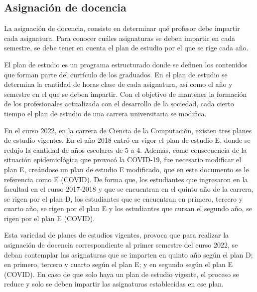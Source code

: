 





\subsection{Asignación de docencia}
La asignación de docencia, consiste en determinar qué profesor debe 
impartir cada asignatura. Para conocer cuáles asignaturas se deben impartir en 
cada semestre, se debe tener en cuenta el plan de estudio por el que se rige cada año.

El plan de estudio es un programa estructurado donde se definen los contenidos que forman parte del currículo de los 
graduados. En el plan de estudio se determina la cantidad de horas clase de cada asignatura, 
así como el año y semestre en el que se deben impartir.
Con el objetivo de mantener la formación de los profesionales actualizada con el desarrollo de la 
sociedad, cada cierto tiempo el plan de estudio de una carrera universitaria se modifica.

En el curso 2022, en la carrera de Ciencia de la Computación, existen tres planes de 
estudio vigentes. En el año 2018 entró en vigor el plan de estudio E, donde 
se redujo la cantidad de años escolares de 5 a 4. Además, como consecuencia de la 
situación epidemiológica que provocó la COVID-19, fue necesario modificar el 
plan E, creándose un plan de estudio E modificado, que en este documento se le referencia como 
E (COVID). De forma que, los estudiantes que ingresaron en la facultad en 
el curso 2017-2018 y que se encuentran en el quinto año de la carrera, se rigen por el plan D, 
los estudiantes que se encuentran en primero, tercero y cuarto año, se rigen por el plan E 
y los estudiantes que cursan el segundo año, se rigen por el plan E (COVID).

Esta variedad de planes de estudios vigentes, provoca que para realizar 
la asignación de docencia correspondiente al primer semestre del curso 2022, se deban 
contemplar las asignaturas que se imparten en quinto año según el plan D;
en primero, tercero y cuarto según el plan E; y en segundo según el plan 
E (COVID). En caso de que solo haya un plan de estudio vigente, el proceso se 
reduce y solo se deben impartir las asignaturas establecidas en ese plan.


